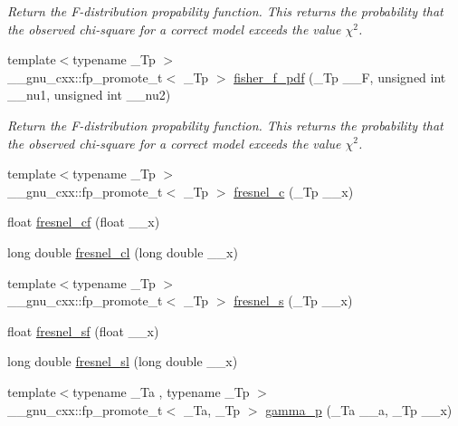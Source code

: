 \begin{DoxyCompactItemize}
\begin{DoxyCompactList}\small\item\em Return the F-\/distribution propability function. This returns the probability that the observed chi-\/square for a correct model exceeds the value $ \chi^2 $. \end{DoxyCompactList}\item 
{\footnotesize template$<$typename \+\_\+\+Tp $>$ }\\\+\_\+\+\_\+gnu\+\_\+cxx\+::fp\+\_\+promote\+\_\+t$<$ \+\_\+\+Tp $>$ \hyperlink{group__mathsf__gnu_gac4564fd8e265c000675e0f38d656a18a}{fisher\+\_\+f\+\_\+pdf} (\+\_\+\+Tp \+\_\+\+\_\+F, unsigned int \+\_\+\+\_\+nu1, unsigned int \+\_\+\+\_\+nu2)
\begin{DoxyCompactList}\small\item\em Return the F-\/distribution propability function. This returns the probability that the observed chi-\/square for a correct model exceeds the value $ \chi^2 $. \end{DoxyCompactList}\item 
{\footnotesize template$<$typename \+\_\+\+Tp $>$ }\\\+\_\+\+\_\+gnu\+\_\+cxx\+::fp\+\_\+promote\+\_\+t$<$ \+\_\+\+Tp $>$ \hyperlink{group__mathsf__gnu_ga92a3585165bfad3f9972fb4210140d22}{fresnel\+\_\+c} (\+\_\+\+Tp \+\_\+\+\_\+x)
\item 
float \hyperlink{group__mathsf__gnu_ga02ca7579d5aef96cba69e38e988e7a42}{fresnel\+\_\+cf} (float \+\_\+\+\_\+x)
\item 
long double \hyperlink{group__mathsf__gnu_gaa3f82a7569d61c2f7c194d2e64b616f8}{fresnel\+\_\+cl} (long double \+\_\+\+\_\+x)
\item 
{\footnotesize template$<$typename \+\_\+\+Tp $>$ }\\\+\_\+\+\_\+gnu\+\_\+cxx\+::fp\+\_\+promote\+\_\+t$<$ \+\_\+\+Tp $>$ \hyperlink{group__mathsf__gnu_ga075a32b4f59a5fa67c2e28232c89ad45}{fresnel\+\_\+s} (\+\_\+\+Tp \+\_\+\+\_\+x)
\item 
float \hyperlink{group__mathsf__gnu_ga73450b8fd4abd5d8d3191dd6cbcda808}{fresnel\+\_\+sf} (float \+\_\+\+\_\+x)
\item 
long double \hyperlink{group__mathsf__gnu_ga5d6ac976fa316df9b943f92bafe1407d}{fresnel\+\_\+sl} (long double \+\_\+\+\_\+x)
\item 
{\footnotesize template$<$typename \+\_\+\+Ta , typename \+\_\+\+Tp $>$ }\\\+\_\+\+\_\+gnu\+\_\+cxx\+::fp\+\_\+promote\+\_\+t$<$ \+\_\+\+Ta, \+\_\+\+Tp $>$ \hyperlink{group__mathsf__gnu_ga692601fa7508c0b97bf549e6362a49b9}{gamma\+\_\+p} (\+\_\+\+Ta \+\_\+\+\_\+a, \+\_\+\+Tp \+\_\+\+\_\+x)

\end{DoxyCompactItemize}
